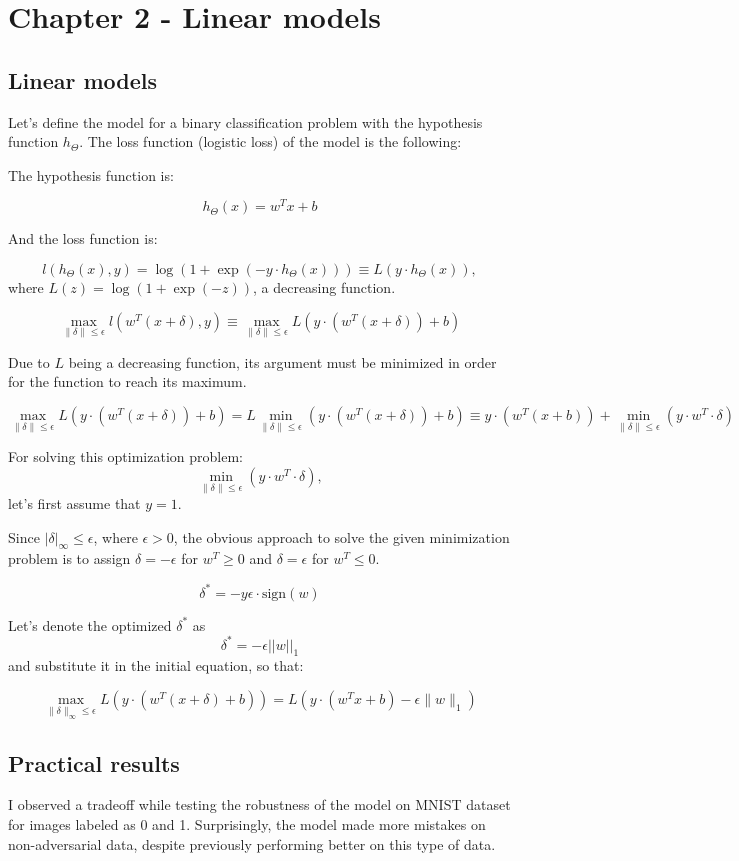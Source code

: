 \section{Chapter 2 - Linear models}

\subsection{Linear models}

Let's define the model for a binary classification problem with the hypothesis function $h_\Theta$.  The loss function (logistic loss) of the model is the following:

The hypothesis function is:

\[h_\Theta(x) = w^T x + b\]

And the loss function is:

\[ l(h_\Theta(x), y) = \log(1 + \exp(-y \cdot h_\Theta(x))) \equiv L(y \cdot h_\Theta(x)), \]
where $L(z)=\log(1+\exp(-z))$, a decreasing function.

\[\max_{\|\delta\| \leq \epsilon} l(w^T (x+\delta), y) \equiv \max_{\|\delta\| \leq \epsilon} L(y \cdot (w^T(x+\delta)) + b)\]

Due to $L$ being a decreasing function, its argument must be minimized in order for the function to reach its maximum. 

\[ \max_{\|\delta\| \leq \epsilon} L(y \cdot (w^T(x+\delta)) + b) = L \min_{\|\delta\| \leq \epsilon}(y \cdot (w^T(x+\delta)) + b) \equiv y \cdot (w^T(x + b)) + \min_{\|\delta\| \leq \epsilon}(y \cdot w^T \cdot \delta)\]

For solving this optimization problem: \[\min_{\|\delta\| \leq \epsilon}(y \cdot w^T \cdot \delta),\] let's first assume
that $y=1$. 

Since $ | \delta |_{\infty} \leq \epsilon $, where $\epsilon > 0$, the obvious approach to solve the given minimization problem is to assign $\delta = -\epsilon$ for $w^T \geq 0$ and $\delta = \epsilon$ for $w^T \leq 0$.

\[\delta^*=-y\epsilon \cdot \text{sign}(w)\]

Let's denote the optimized $\delta^*$ as \[\delta^* = -\epsilon ||w||_1\]
and substitute it in the initial equation, so that:

\[\max_{\|\delta\|_{\infty} \leq \epsilon} L(y \cdot (w^T(x+\delta)+b)) = L(y \cdot (w^Tx+b) - \epsilon \|w\|_1)\]

\subsection{Practical results}
I observed a tradeoff while testing the robustness of the model on MNIST dataset for images labeled as 0 and 1. Surprisingly, the model made more mistakes on non-adversarial data, despite previously performing better on this type of data.